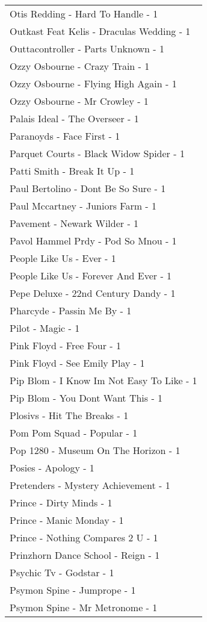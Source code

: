 \documentclass[
]{article}
\begin{document}
\begin{longtable}{l}
Otis Redding - Hard To Handle - 1 \\ 
Outkast Feat Kelis - Draculas Wedding - 1 \\ 
Outtacontroller - Parts Unknown - 1 \\ 
Ozzy Osbourne - Crazy Train - 1 \\ 
Ozzy Osbourne - Flying High Again - 1 \\ 
Ozzy Osbourne - Mr Crowley - 1 \\ 
Palais Ideal - The Overseer - 1 \\ 
Paranoyds - Face First - 1 \\ 
Parquet Courts - Black Widow Spider - 1 \\ 
Patti Smith - Break It Up - 1 \\ 
Paul Bertolino - Dont Be So Sure - 1 \\ 
Paul Mccartney - Juniors Farm - 1 \\ 
Pavement - Newark Wilder - 1 \\ 
Pavol Hammel Prdy - Pod So Mnou - 1 \\ 
People Like Us - Ever - 1 \\ 
People Like Us - Forever And Ever - 1 \\ 
Pepe Deluxe - 22nd Century Dandy - 1 \\ 
Pharcyde - Passin Me By - 1 \\ 
Pilot - Magic - 1 \\ 
Pink Floyd - Free Four - 1 \\ 
Pink Floyd - See Emily Play - 1 \\ 
Pip Blom - I Know Im Not Easy To Like - 1 \\ 
Pip Blom - You Dont Want This - 1 \\ 
Plosivs - Hit The Breaks - 1 \\ 
Pom Pom Squad - Popular - 1 \\ 
Pop 1280 - Museum On The Horizon - 1 \\ 
Posies - Apology - 1 \\ 
Pretenders - Mystery Achievement - 1 \\ 
Prince - Dirty Minds - 1 \\ 
Prince - Manic Monday - 1 \\ 
Prince - Nothing Compares 2 U - 1 \\ 
Prinzhorn Dance School - Reign - 1 \\ 
Psychic Tv - Godstar - 1 \\ 
Psymon Spine - Jumprope - 1 \\ 
Psymon Spine - Mr Metronome - 1 \\ 

\end{longtable}
\end{document}
